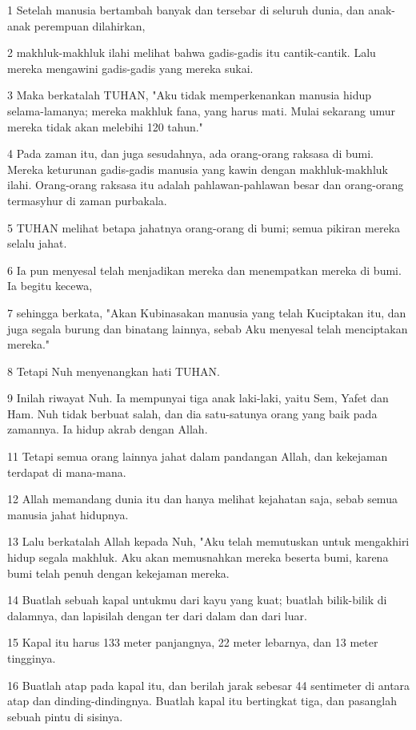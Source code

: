 \par 1 Setelah manusia bertambah banyak dan tersebar di seluruh dunia, dan anak-anak perempuan dilahirkan,
\par 2 makhluk-makhluk ilahi melihat bahwa gadis-gadis itu cantik-cantik. Lalu mereka mengawini gadis-gadis yang mereka sukai.
\par 3 Maka berkatalah TUHAN, "Aku tidak memperkenankan manusia hidup selama-lamanya; mereka makhluk fana, yang harus mati. Mulai sekarang umur mereka tidak akan melebihi 120 tahun."
\par 4 Pada zaman itu, dan juga sesudahnya, ada orang-orang raksasa di bumi. Mereka keturunan gadis-gadis manusia yang kawin dengan makhluk-makhluk ilahi. Orang-orang raksasa itu adalah pahlawan-pahlawan besar dan orang-orang termasyhur di zaman purbakala.
\par 5 TUHAN melihat betapa jahatnya orang-orang di bumi; semua pikiran mereka selalu jahat.
\par 6 Ia pun menyesal telah menjadikan mereka dan menempatkan mereka di bumi. Ia begitu kecewa,
\par 7 sehingga berkata, "Akan Kubinasakan manusia yang telah Kuciptakan itu, dan juga segala burung dan binatang lainnya, sebab Aku menyesal telah menciptakan mereka."
\par 8 Tetapi Nuh menyenangkan hati TUHAN.
\par 9 Inilah riwayat Nuh. Ia mempunyai tiga anak laki-laki, yaitu Sem, Yafet dan Ham. Nuh tidak berbuat salah, dan dia satu-satunya orang yang baik pada zamannya. Ia hidup akrab dengan Allah.
\par 11 Tetapi semua orang lainnya jahat dalam pandangan Allah, dan kekejaman terdapat di mana-mana.
\par 12 Allah memandang dunia itu dan hanya melihat kejahatan saja, sebab semua manusia jahat hidupnya.
\par 13 Lalu berkatalah Allah kepada Nuh, "Aku telah memutuskan untuk mengakhiri hidup segala makhluk. Aku akan memusnahkan mereka beserta bumi, karena bumi telah penuh dengan kekejaman mereka.
\par 14 Buatlah sebuah kapal untukmu dari kayu yang kuat; buatlah bilik-bilik di dalamnya, dan lapisilah dengan ter dari dalam dan dari luar.
\par 15 Kapal itu harus 133 meter panjangnya, 22 meter lebarnya, dan 13 meter tingginya.
\par 16 Buatlah atap pada kapal itu, dan berilah jarak sebesar 44 sentimeter di antara atap dan dinding-dindingnya. Buatlah kapal itu bertingkat tiga, dan pasanglah sebuah pintu di sisinya.
